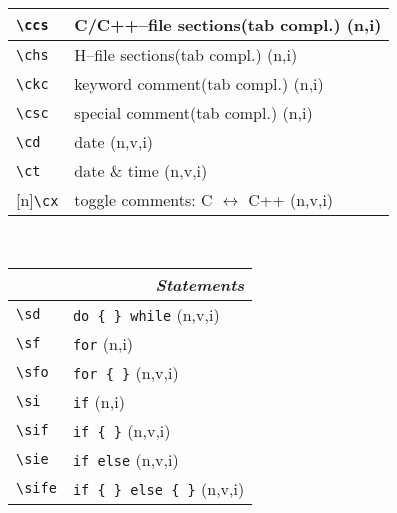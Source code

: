 \documentclass[oneside,11pt,landscape,DIV17]{scrartcl}
\newcommand{\Rep}{{\tiny{[n]}}}
\begin{document}
\begin{multicols}{3}
\begin{center}
\begin{tabular}[]{|p{10mm}|p{60mm}|}
\hline \verb'\ccs'& C/C++--file sections\hspace{3mm}\footnotesize{(tab compl.)}    \hfill \normalsize{(n,i)}\\
\hline \verb'\chs'& H--file sections\hspace{10mm}\footnotesize{(tab compl.)}       \hfill \normalsize{(n,i)}\\
\hline \verb'\ckc'& keyword comment\hspace{5mm}\footnotesize{(tab compl.)}         \hfill \normalsize{(n,i)}\\
\hline \verb'\csc'& special comment\hspace{7,5mm}\footnotesize{(tab compl.)}       \hfill \normalsize{(n,i)}\\

\hline \verb'\cd' & date                                    \hfill (n,v,i)\\
\hline \verb'\ct' & date \& time                            \hfill (n,v,i)\\
\hline \Rep\verb'\cx' & toggle comments: C $\leftrightarrow$ C++                  \hfill (n,v,i)\\
\hline 
\end{tabular}\\
%
%
\begin{tabular}[]{|p{15mm}|p{55mm}|}
\hline
\multicolumn{2}{|r|}{\textsl{\textbf{S}tatements}} \\
\hline \verb'\sd'  & \verb'do { } while'        \hfill (n,v,i)\\
\hline \verb'\sf'  & \verb'for'                 \hfill (n,i)\\
\hline \verb'\sfo' & \verb'for { }'             \hfill (n,v,i)\\
\hline \verb'\si'  & \verb'if'                  \hfill (n,i)\\
\hline \verb'\sif' & \verb'if { }'              \hfill (n,v,i)\\
\hline \verb'\sie' & \verb'if else'             \hfill (n,v,i)\\
\hline \verb'\sife'& \verb'if { } else { }'     \hfill (n,v,i)\\

\end{tabular}
\end{center}
\end{multicols}
\end{document}
